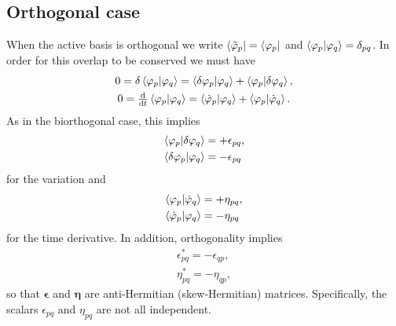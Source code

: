 \documentclass[aip,jcp,preprint,superscriptaddress,nofootinbib]{revtex4-1}
\begin{document}
\subsection{Orthogonal case}
When the active basis is orthogonal we write $\bra{\tilde{\varphi}_{p}} = \bra{\varphi_{p}}$
and $\braket{\varphi_{p} | \varphi_{q}} = \delta_{pq}$. In order for this overlap
to be conserved we must have
\begin{subequations}
    \begin{gather}
        0 
        = \delta \braket{\varphi_{p} | \varphi_{q}} 
        = \braket{\delta \varphi_{p} | \varphi_{q}}
        + \braket{\varphi_{p} | \delta \varphi_{q}}, \\
        0 
        = \tfrac{\mathrm{d}}{\mathrm{d} t} \braket{\varphi_{p} | \varphi_{q}} 
        = \braket{\dot{\varphi}_{p} | \varphi_{q}}
        + \braket{\varphi_{p} | \dot{\varphi}_{q}}.
    \end{gather}
\end{subequations}
As in the biorthogonal case, this implies
\begin{subequations}
    \begin{align}
        \braket{\varphi_{p} | \delta \varphi_{q}} &= +\epsilon_{pq}, \\
        \braket{\delta \varphi_{p} | \varphi_{q}} &= -\epsilon_{pq}
    \end{align}
\end{subequations}
for the variation and
\begin{subequations}
    \begin{align}
        \braket{\varphi_{p} | \dot{\varphi}_{q}} &= +\eta_{pq}, \\
        \braket{\dot{\varphi}_{p} | \varphi_{q}} &= -\eta_{pq}
    \end{align}
\end{subequations}
for the time derivative. In addition, orthogonality implies
\begin{subequations}
    \begin{align}
        \epsilon_{pq}^{*} = -\epsilon_{qp}, \\
        \eta_{pq}^{*}     = -\eta_{qp},
    \end{align}
\end{subequations}
so that $\bm{\epsilon}$ and $\bm{\eta}$ are anti-Hermitian (skew-Hermitian) matrices.
Specifically, the scalars $\epsilon_{pq}$ and $\eta_{pq}$ are not all independent.
\end{document}

